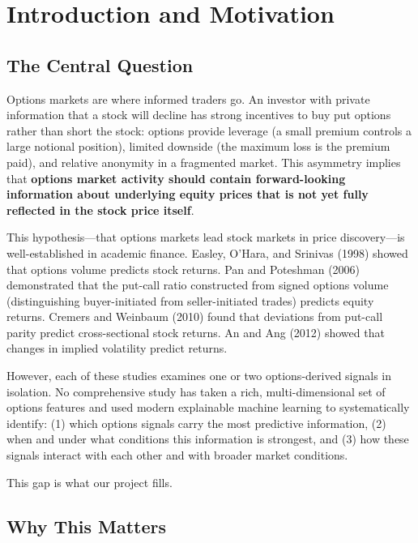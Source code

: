 \documentclass[11pt,a4paper]{article}
\begin{document}
\begin{titlepage}
\end{titlepage}

\tableofcontents
\newpage

\section{Introduction and Motivation}

\subsection{The Central Question}

Options markets are where informed traders go. An investor with private information that a stock will decline has strong incentives to buy put options rather than short the stock: options provide leverage (a small premium controls a large notional position), limited downside (the maximum loss is the premium paid), and relative anonymity in a fragmented market. This asymmetry implies that \textbf{options market activity should contain forward-looking information about underlying equity prices that is not yet fully reflected in the stock price itself}.

This hypothesis---that options markets lead stock markets in price discovery---is well-established in academic finance. Easley, O'Hara, and Srinivas (1998) showed that options volume predicts stock returns. Pan and Poteshman (2006) demonstrated that the put-call ratio constructed from signed options volume (distinguishing buyer-initiated from seller-initiated trades) predicts equity returns. Cremers and Weinbaum (2010) found that deviations from put-call parity predict cross-sectional stock returns. An and Ang (2012) showed that changes in implied volatility predict returns.

However, each of these studies examines one or two options-derived signals in isolation. No comprehensive study has taken a rich, multi-dimensional set of options features and used modern explainable machine learning to systematically identify: (1) which options signals carry the most predictive information, (2) when and under what conditions this information is strongest, and (3) how these signals interact with each other and with broader market conditions.

This gap is what our project fills.

\subsection{Why This Matters}
\end{document}
